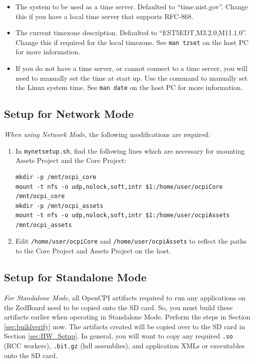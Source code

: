 \begin{itemize}
 \item The system to be used as a time server. Defaulted to ``time.nist.gov''. Change this if you have a local time server that supports RFC-868.
 \item The current timezone description. Defaulted to ``EST5EDT,M3.2.0,M11.1.0''.  Change this if required for the local timezone. See \texttt{man tzset} on the host PC for more information.
 \item If you do not have a time server, or cannot connect to a time server, you will need to manually set the time at start up.  Use the  command to manually set the Linux system time. See \texttt{man date} on the host PC for more information.
 \end{itemize}

\subsection{Setup for Network Mode}
\begin{flushleft}
\textit{When using Network Mode}, the following modifications are required:
\end{flushleft}

\begin{enumerate}
\item In \texttt{mynetsetup.sh}, find the following lines which are necessary for mounting Assets Project and the Core Project:
\begin{verbatim}
mkdir -p /mnt/ocpi_core
mount -t nfs -o udp,nolock,soft,intr $1:/home/user/ocpiCore /mnt/ocpi_core
mkdir -p /mnt/ocpi_assets
mount -t nfs -o udp,nolock,soft,intr $1:/home/user/ocpiAssets /mnt/ocpi_assets
\end{verbatim}
 \item Edit \texttt{/home/user/ocpiCore} and \texttt{/home/user/ocpiAssets} to reflect the paths to the Core Project and Assets Project on the host. \\
\end{enumerate}

\label{sec:buildNow}
\subsection{Setup for Standalone Mode}
\textit{For Standalone Mode}, all OpenCPI artifacts required to run any applications on the ZedBoard need to be copied onto the SD card.  So, you must build these artifacts earlier when operating in Standalone Mode. Perform the steps in Section \ref{sec:buildverify}  now. The artifacts created will be copied over to the SD card in Section \ref{sec:HW_Setup}. In general, you will want to copy any required \texttt{.so} (RCC workers), \texttt{.bit.gz} (hdl assemblies), and application XMLs or executables onto the SD card.

